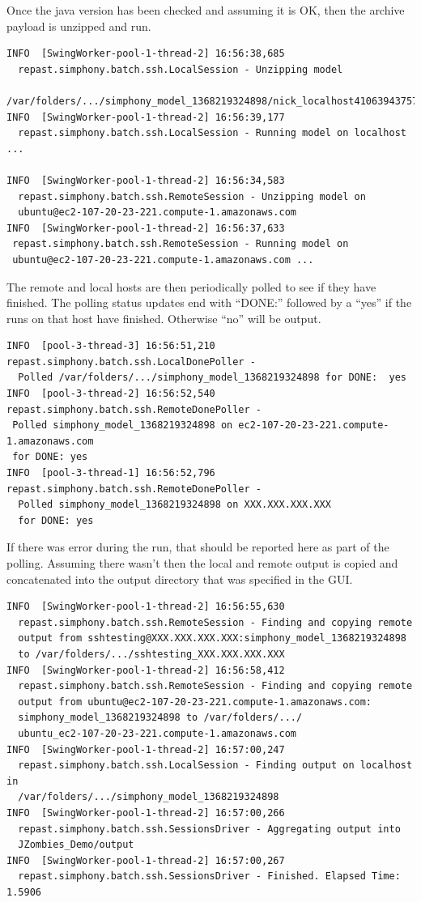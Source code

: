 \documentclass[11pt]{amsart}
\begin{document}
Once the java version has been checked and assuming it is OK, then the archive payload is unzipped and run.

\begin{verbatim}
INFO  [SwingWorker-pool-1-thread-2] 16:56:38,685 
  repast.simphony.batch.ssh.LocalSession - Unzipping model 
  /var/folders/.../simphony_model_1368219324898/nick_localhost4106394375716993975.zip
INFO  [SwingWorker-pool-1-thread-2] 16:56:39,177 
  repast.simphony.batch.ssh.LocalSession - Running model on localhost ...

INFO  [SwingWorker-pool-1-thread-2] 16:56:34,583 
  repast.simphony.batch.ssh.RemoteSession - Unzipping model on 
  ubuntu@ec2-107-20-23-221.compute-1.amazonaws.com
INFO  [SwingWorker-pool-1-thread-2] 16:56:37,633 
 repast.simphony.batch.ssh.RemoteSession - Running model on 
 ubuntu@ec2-107-20-23-221.compute-1.amazonaws.com ...
\end{verbatim}

The remote and local hosts are then periodically polled to see if they have finished. The polling status updates end with ``DONE:'' followed by a ``yes'' if the runs on that host have finished. Otherwise ``no'' will be output.

\begin{verbatim}
INFO  [pool-3-thread-3] 16:56:51,210 repast.simphony.batch.ssh.LocalDonePoller - 
  Polled /var/folders/.../simphony_model_1368219324898 for DONE:  yes
INFO  [pool-3-thread-2] 16:56:52,540 repast.simphony.batch.ssh.RemoteDonePoller - 
 Polled simphony_model_1368219324898 on ec2-107-20-23-221.compute-1.amazonaws.com 
 for DONE: yes
INFO  [pool-3-thread-1] 16:56:52,796 repast.simphony.batch.ssh.RemoteDonePoller - 
  Polled simphony_model_1368219324898 on XXX.XXX.XXX.XXX 
  for DONE: yes
\end{verbatim}

If there was error during the run, that should be reported here as part of the polling. Assuming there wasn't then the local and remote output is copied and concatenated into the output directory that was specified in the GUI.

\begin{verbatim}
INFO  [SwingWorker-pool-1-thread-2] 16:56:55,630 
  repast.simphony.batch.ssh.RemoteSession - Finding and copying remote 
  output from sshtesting@XXX.XXX.XXX.XXX:simphony_model_1368219324898 
  to /var/folders/.../sshtesting_XXX.XXX.XXX.XXX
INFO  [SwingWorker-pool-1-thread-2] 16:56:58,412 
  repast.simphony.batch.ssh.RemoteSession - Finding and copying remote
  output from ubuntu@ec2-107-20-23-221.compute-1.amazonaws.com:
  simphony_model_1368219324898 to /var/folders/.../
  ubuntu_ec2-107-20-23-221.compute-1.amazonaws.com
INFO  [SwingWorker-pool-1-thread-2] 16:57:00,247 
  repast.simphony.batch.ssh.LocalSession - Finding output on localhost in
  /var/folders/.../simphony_model_1368219324898
INFO  [SwingWorker-pool-1-thread-2] 16:57:00,266 
  repast.simphony.batch.ssh.SessionsDriver - Aggregating output into 
  JZombies_Demo/output
INFO  [SwingWorker-pool-1-thread-2] 16:57:00,267 
  repast.simphony.batch.ssh.SessionsDriver - Finished. Elapsed Time: 1.5906
\end{verbatim}
\end{document}

